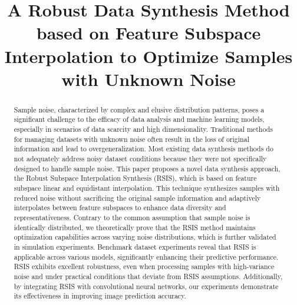 \documentclass[lettersize,journal]{IEEEtran}
\begin{document}
\title{A Robust Data Synthesis Method based on Feature Subspace 
Interpolation to Optimize Samples with Unknown Noise}






\maketitle

\begin{abstract}
Sample noise, characterized by complex and elusive distribution 
patterns, poses a significant challenge to the efficacy of data 
analysis and machine learning models, especially in scenarios of 
data scarcity and high dimensionality. Traditional methods for 
managing datasets with unknown noise often result in the loss of 
original information and lead to overgeneralization. Most existing 
data synthesis methods do not adequately address noisy dataset 
conditions because they were not specifically designed to handle 
sample noise. This paper proposes a novel data synthesis approach, 
the Robust Subspace Interpolation Synthesis (RSIS), which is based on 
feature subspace linear and equidistant interpolation. This technique 
synthesizes samples with reduced noise without sacrificing the 
original sample information and adaptively interpolates between 
feature subspaces to enhance data diversity and representativeness. 
Contrary to the common assumption that sample noise is identically 
distributed, we theoretically prove that the RSIS method maintains 
optimization capabilities across varying noise distributions, which 
is further validated in simulation experiments. Benchmark dataset 
experiments reveal that RSIS is applicable across various models, 
significantly enhancing their predictive performance. RSIS exhibits 
excellent robustness, even when processing samples with 
high-variance noise and under practical conditions that deviate 
from RSIS assumptions. Additionally, by integrating RSIS with 
convolutional neural networks, our experiments demonstrate its 
effectiveness in improving image prediction accuracy.
\end{abstract}
\end{document}
